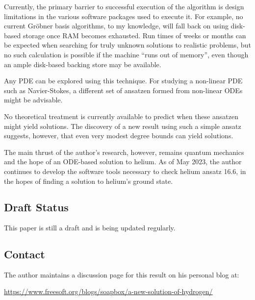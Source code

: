 \documentclass{article}
\begin{document}
Currently, the primary barrier to successful execution of the algorithm is
design limitations in the various software packages used to execute it.
For example, no current Gr\"obner basis algorithms, to my knowledge,
will fall back on using disk-based storage once RAM becomes exhausted.
Run times of weeks or months can be expected when searching for
truly unknown solutions to realistic problems, but no such
calculation is possible if the machine ``runs out of memory'',
even though an ample disk-based backing store may be available.

Any PDE can be explored using this technique.  For studying a
non-linear PDE such as Navier-Stokes, a different set of
ansatzen formed from non-linear ODEs might be advisable.

No theoretical treatment is currently available to predict
when these ansatzen might yield solutions.  The discovery
of a new result using such a simple ansatz suggests, however,
that even very modest degree bounds can yield solutions.

The main thrust of the author's research, however, remains
quantum mechanics and the hope of an ODE-based solution
to helium.  As of May 2023, the author continues to develop
the software tools necessary to check helium ansatz 16.6,
in the hopes of finding a solution to helium's ground state.

\subsection*{Draft Status}

This paper is still a draft and is being updated regularly.

\subsection*{Contact}

The author maintains a discussion page for this result on his personal blog at:

\begin{center}
\small
\url{https://www.freesoft.org/blogs/soapbox/a-new-solution-of-hydrogen/}
\end{center}
\end{document}
